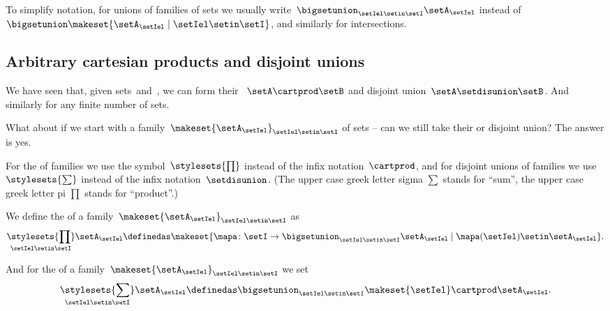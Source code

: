 \begin{remark}
    To simplify notation, for unions of families of sets we usually write~$\bigsetunion_{\setIel\setin \setI} \setA_\setIel$ instead of~$\bigsetunion \makeset{ \setA_\setIel \mid \setIel \setin\setI }$, and similarly for intersections.
\end{remark}

\subsection{Arbitrary cartesian products and disjoint unions}

We have seen that, given sets~\setA and~\setB, we can form their ~$\setA \cartprod \setB$ and disjoint union~$\setA \setdisunion \setB$.
And similarly for any finite number of sets.

What about if we start with a family~$\makeset{ \setA_\setIel }_{\setIel \setin\setI}$ of sets -- can we still take their  or disjoint union?
The answer is yes.

For the  of families we use the symbol~$\stylesets{\prod}$ instead of the infix notation~$\cartprod$, and for disjoint unions of families we use~$\stylesets{\sum}$ instead of the infix notation~$\setdisunion$.
(The upper case greek letter sigma $\sum$ stands for ``sum'', the upper case greek letter pi $\prod$ stands for ``product''.)

We define the  of a family~$\makeset{ \setA_{\setIel} }_{\setIel \setin\setI}$ as
\begin{equation}
    \underset{\setIel \setin\setI}{\stylesets{\prod}} \setA_{\setIel} \definedas \makeset{ \mapa \colon \setI \to \bigsetunion_{\setIel \setin\setI } \setA_{\setIel} \mid \mapa(\setIel) \setin\setA_{\setIel}}.
\end{equation}

And for the  of a family~$\makeset{ \setA_{\setIel} }_{\setIel \setin\setI}$ we set
\begin{equation}
    \underset{\setIel \setin\setI}{\stylesets{\sum}} \setA_{\setIel} \definedas \bigsetunion_{\setIel \setin\setI} \makeset{ \setIel } \cartprod \setA_{\setIel}.
\end{equation}

